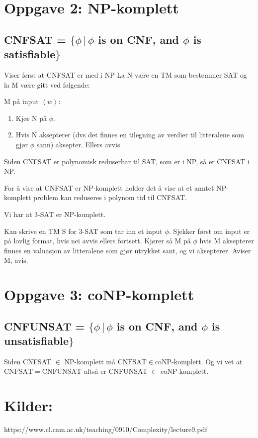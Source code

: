 \documentclass{article}
\begin{document}
\section{Oppgave 2: NP-komplett}
\subsection{CNFSAT = $\{\phi \, |  \, \phi $ is on CNF, and $\phi$ is satisfiable$\}$}


Viser først at CNFSAT er med i NP
La N være en TM som bestemmer SAT og la  M være gitt ved følgende:

M på input $\left<w\right>$:
\begin{enumerate}
\item Kjør N på $\phi$.
\item Hvis N aksepterer (dvs det finnes en tilegning av verdier til litteralene som gjør $\phi$ sann) aksepter. Ellers avvis.
\end{enumerate}
Siden CNFSAT er polynomisk reduserbar til SAT, som er i NP, så er CNFSAT i NP.


For å vise at CNFSAT er NP-komplett holder det å vise at et anntet NP-komplett problem kan reduseres i polynom tid til CNFSAT.

Vi har at 3-SAT er NP-komplett.

Kan skrive en TM S for 3-SAT som tar inn et input $\phi$. Sjekker først om input er på lovlig format, hvis nei avvis ellers fortsett. Kjører så M på $\phi$ hvis M aksepterer finnes en valuasjon av litteralene som gjør utrykket sant, og vi aksepterer. Aviser M, avis.



\section{Oppgave 3: coNP-komplett}
\subsection{CNFUNSAT = $\{\phi \, |  \, \phi $ is on CNF, and $\phi$ is unsatisfiable$\}$}

Siden CNFSAT $\in$ NP-komplett må $\overline{\text{CNFSAT}} \in \text{coNP-komplett}$.
Og vi vet at $\overline{\text{CNFSAT}} = \text{CNFUNSAT}$ altså er CNFUNSAT $\in $ coNP-komplett.



\section{Kilder:}
https://www.cl.cam.ac.uk/teaching/0910/Complexity/lecture9.pdf
\end{document}
